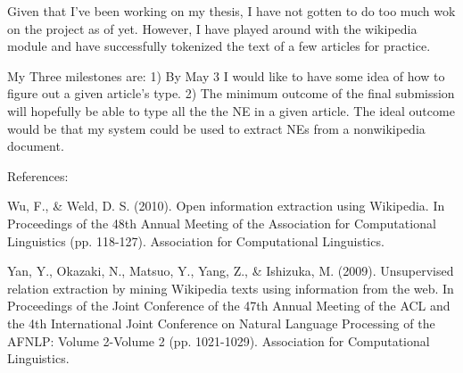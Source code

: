 \documentclass[11pt]{article}
\begin{document}
Given that I've been working on my thesis, I have not gotten to do too much wok on the project as of yet. However, I have played around with the wikipedia module and have successfully tokenized the text of a few articles for practice.

My Three milestones are: 1) By May 3 I would like to have some idea of how to figure out a given article's type. 2) The minimum outcome of the final submission will hopefully be able to type all the the NE in a given article. The ideal outcome would be that my system could be used to extract NEs from a nonwikipedia document.


References:

Wu, F., \& Weld, D. S. (2010). Open information extraction using Wikipedia. In Proceedings of the 48th Annual Meeting of the Association for Computational Linguistics (pp. 118-127). Association for Computational Linguistics.

Yan, Y., Okazaki, N., Matsuo, Y., Yang, Z., \& Ishizuka, M. (2009). Unsupervised relation extraction by mining Wikipedia texts using information from the web. In Proceedings of the Joint Conference of the 47th Annual Meeting of the ACL and the 4th International Joint Conference on Natural Language Processing of the AFNLP: Volume 2-Volume 2 (pp. 1021-1029). Association for Computational Linguistics.
\end{document}
